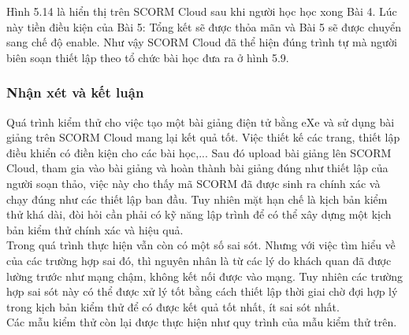 Hình 5.14 là hiển thị trên SCORM Cloud sau khi người học học xong Bài 4. Lúc này tiền điều kiện của Bài 5: Tổng kết sẽ được thỏa mãn và Bài 5 sẽ được chuyển sang chế độ enable. Như vậy SCORM Cloud đã thể hiện đúng trình tự mà người biên soạn thiết lập theo tổ chức bài học đưa ra ở hình 5.9.

\newpage


\subsubsection{Nhận xét và kết luận}

Quá trình kiểm thử cho việc tạo một bài giảng điện tử bằng eXe và sử dụng bài giảng trên SCORM Cloud mang lại kết quả tốt. Việc thiết kế các trang, thiết lập điều khiển có điền kiện cho các bài học,... Sau đó upload bài giảng lên SCORM Cloud, tham gia vào bài giảng và hoàn thành bài giảng đúng như thiết lập của người soạn thảo, việc này cho thấy mã SCORM đã được sinh ra chính xác và chạy đúng như các thiết lập ban đầu. Tuy nhiên mặt hạn chế là kịch bản kiểm thử khá dài, đòi hỏi cần phải có kỹ năng lập trình để có thể xây dựng một kịch bản kiểm thử chính xác và hiệu quả.\\

Trong quá trình thực hiện vẫn còn có một số sai sót. Nhưng với việc tìm hiểu về của các trường hợp sai đó, thì nguyên nhân là từ các lý do khách quan đã được lường trước như mạng chậm, không kết nối được vào mạng. Tuy nhiên các trường hợp sai sót này có thể được xử lý tốt bằng cách thiết lập thời giai chờ đợi hợp lý trong kịch bản kiểm thử để có được kết quả tốt nhất, ít sai sót nhất.\\

Các mẫu kiểm thử còn lại được thực hiện như quy trình của mẫu kiểm thử trên.






































